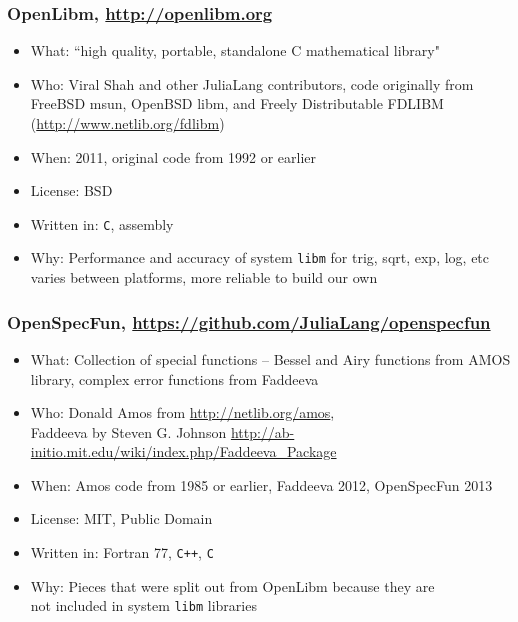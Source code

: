 \documentclass[compressed,dvips,letter]{beamer}
\begin{document}
\begin{frame}\frametitle{OpenLibm, \url{http://openlibm.org}}

\begin{itemize}
\item What: ``high quality, portable, standalone C mathematical library"
\item Who: Viral Shah and other JuliaLang contributors, code originally from FreeBSD msun, OpenBSD libm, and Freely Distributable FDLIBM (\url{http://www.netlib.org/fdlibm})
\item When: 2011, original code from 1992 or earlier
\item License: BSD
\item Written in: \texttt{C}, assembly
\item Why: Performance and accuracy of system \texttt{libm} for trig, sqrt, exp, log, etc varies between platforms, more reliable to build our own
\end{itemize}

\end{frame}

%
%

\begin{frame}\frametitle{OpenSpecFun, {\small \url{https://github.com/JuliaLang/openspecfun}}}

\begin{itemize}
\item What: Collection of special functions -- Bessel and Airy functions from AMOS library, complex error functions from Faddeeva
\item Who: Donald Amos from \url{http://netlib.org/amos}, \\
Faddeeva by Steven G. Johnson {\small \url{http://ab-initio.mit.edu/wiki/index.php/Faddeeva_Package}}
\item When: Amos code from 1985 or earlier, Faddeeva 2012, OpenSpecFun 2013
\item License: MIT, Public Domain
\item Written in: Fortran 77, \texttt{C++}, \texttt{C}
\item Why: Pieces that were split out from OpenLibm because they are \\
not included in system \texttt{libm} libraries
\end{itemize}

\end{frame}

%
%
\end{document}
